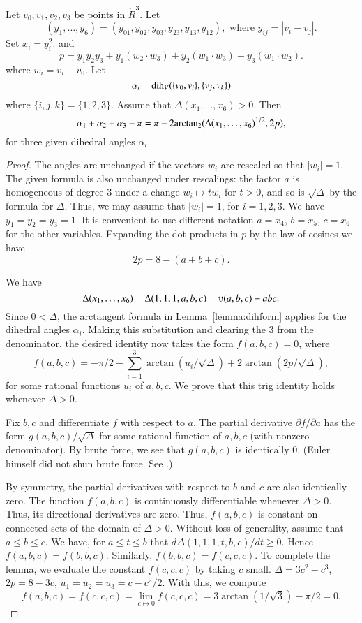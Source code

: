 \begin{lemma}\label{lemma:euler}
Let $v_0,v_1,v_2,v_3$ be points in $\ring{R}^3$. 
Let 
  $$(y_1,\ldots,y_6) =(y_{01},y_{02},y_{03},y_{23},y_{13},y_{12}),
   \text{ where } y_{ij}=|v_i-v_j|.$$
Set
$x_i = y_i^2$.   
and
    $$
    p = y_1 y_2 y_3 + y_1 (w_2\cdot w_3) + y_2 (w_1\cdot w_3) + y_3
    (w_1\cdot w_2).
    $$
where $w_i = v_i- v_0$.
Let $$\alpha_i =\operatorname{dih}_V(\{v_0,v_i\},\{v_j,v_k\})$$
where $\{i,j,k\}=\{1,2,3\}$.
Assume that $\Delta(x_1,\ldots,x_6)>0$. 
Then
    $$
    \alpha_1+\alpha_2+\alpha_3 - \pi
     = {\pi} - 2{\operatorname{arctan_2}}({\Delta(x_1,\ldots,x_6)^{1/2}},{2 p}),
    $$
for three given dihedral angles $\alpha_i$.
\end{lemma}

\begin{proof}
The angles are unchanged if the vectors $w_i$ are rescaled so that
$|w_i|=1$.  The given formula is also unchanged under rescalings:
the factor $a$ is homogeneous of degree $3$ under a change $w_i
\mapsto t w_i$ for $t>0$, and so is $\sqrt{\Delta}$ by the
formula for $\Delta$.  Thus, we may assume that $|w_i|=1$, for
$i=1,2,3$. We have $y_1=y_2=y_3=1$.  It is convenient to use
different notation $a=x_4$, $b=x_5$, $c=x_6$ for the other
variables. Expanding the dot products in $p$ by the law of cosines
we have
    $$2 p = 8 - (a+b+c).$$

We have $$\Delta(x_1,\ldots,x_6) = \Delta(1,1,1,a,b,c) =
    \ups(a,b,c) - a b c.$$
Since $0 <\Delta$, the arctangent formula
in Lemma~\ref{lemma:dihform} 
applies for the dihedral angles $\alpha_i$. Making
this substitution and clearing the $3$ from the denominator, the
desired identity now takes the form $f(a,b,c)=0$, where
    $$
    f(a,b,c)= -\pi/2 - \sum_{i=1}^3\arctan(u_i/\sqrt{\Delta}) +
    2\arctan(2 p/\sqrt{\Delta}),
    $$
for some rational functions $u_i$ of $a,b,c$.  We prove that this
trig identity holds whenever $\Delta>0$.

Fix $b,c$ and differentiate $f$ with respect
to $a$.  The partial derivative $\partial f/\partial a$ has the form
$g(a,b,c)/\sqrt{\Delta}$ for some rational function of $a,b,c$ (with
nonzero denominator).  By brute force, we see that $g(a,b,c)$ is
identically $0$.  (Euler himself did not shun brute force.  See
\cite{Euler}.)

By symmetry, the partial derivatives with respect to $b$ and $c$ are
also identically zero.  The function $f(a,b,c)$  is continuously
differentiable whenever $\Delta>0$.  Thus, its directional
derivatives are zero.  Thus, $f(a,b,c)$ is constant on connected
sets of the domain of $\Delta>0$.  Without loss of generality,
assume that $a\le b\le c$.  We have, for $a\le t\le b$ that
$d\Delta(1,1,1,t,b,c)/dt\ge 0$. Hence $f(a,b,c)=f(b,b,c)$. 
Similarly,
 $f(b,b,c)=f(c,c,c)$. 
To complete the lemma, we evaluate the constant $f(c,c,c)$
by taking $c$ small.
$\Delta=3c^2-c^3$, $2p= 8-3c$,  $u_1=u_2=u_3 = c -c^2/2$. With this,
we compute
    $$f(a,b,c)= f(c,c,c) = \lim_{c\mapsto0} f(c,c,c) = 
    3 \arctan(1/\sqrt3)-\pi/2 =0.$$
\end{proof}








